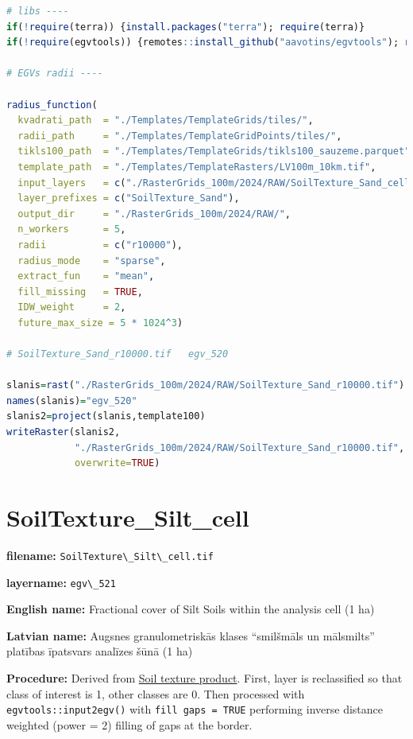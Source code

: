 \documentclass[
]{book}
\newcommand{\passthrough}[1]{#1}
\begin{document}
\begin{lstlisting}[language=R]
# libs ----
if(!require(terra)) {install.packages("terra"); require(terra)}
if(!require(egvtools)) {remotes::install_github("aavotins/egvtools"); require(egvtools)}

# EGVs radii ----

radius_function(
  kvadrati_path  = "./Templates/TemplateGrids/tiles/",
  radii_path     = "./Templates/TemplateGridPoints/tiles/",
  tikls100_path  = "./Templates/TemplateGrids/tikls100_sauzeme.parquet",
  template_path  = "./Templates/TemplateRasters/LV100m_10km.tif",
  input_layers   = c("./RasterGrids_100m/2024/RAW/SoilTexture_Sand_cell.tif"),
  layer_prefixes = c("SoilTexture_Sand"),
  output_dir     = "./RasterGrids_100m/2024/RAW/",
  n_workers      = 5,
  radii          = c("r10000"),
  radius_mode    = "sparse",
  extract_fun    = "mean",
  fill_missing   = TRUE,
  IDW_weight     = 2,
  future_max_size = 5 * 1024^3)

# SoilTexture_Sand_r10000.tif   egv_520

slanis=rast("./RasterGrids_100m/2024/RAW/SoilTexture_Sand_r10000.tif")
names(slanis)="egv_520"
slanis2=project(slanis,template100)
writeRaster(slanis2,
            "./RasterGrids_100m/2024/RAW/SoilTexture_Sand_r10000.tif",
            overwrite=TRUE)
\end{lstlisting}

\section{SoilTexture\_Silt\_cell}\label{ch06.521}

\textbf{filename:} \passthrough{\lstinline!SoilTexture\_Silt\_cell.tif!}

\textbf{layername:} \passthrough{\lstinline!egv\_521!}

\textbf{English name:} Fractional cover of Silt Soils within the analysis cell (1 ha)

\textbf{Latvian name:} Augsnes granulometriskās klases ``smilšmāls un mālsmilts'' platības īpatsvars analīzes šūnā (1 ha)

\textbf{Procedure:} Derived from \hyperref[Ch05.02]{Soil texture product}. First, layer is
reclassified so that class of interest is 1, other classes are 0. Then processed
with \passthrough{\lstinline!egvtools::input2egv()!} with \passthrough{\lstinline!fill gaps = TRUE!} performing inverse
distance weighted (power = 2) filling of gaps at the border.
\end{document}
